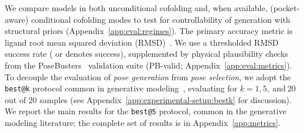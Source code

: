 \documentclass[11pt, letterpaper, onecolumn]{tau-class/tau}
\makeatletter
\newcommand{\best}[1]{\texttt{best@#1}\xspace}
\newcommand{\bestk}{\best{k}}
\newcommand{\ltonea}{\text{\raisebox{0.25ex}{\scriptsize <}\,1\,\AA}\xspace}
\newcommand{\lttwoa}{\text{\raisebox{0.25ex}{\scriptsize <}\,2\,\AA}\xspace}
\newcommand{\posebusters}{PoseBusters\xspace}
\let\oldAA\AA
\renewcommand{\AA}{\oldAA\xspace}
\makeatother
\begin{document}
We compare models in both unconditional cofolding and, when available, (pocket-aware) conditional cofolding modes to test for controllability of generation with structural priors (Appendix~\ref{app:eval:regimes}).
The primary accuracy metric is ligand root mean squared deviation (RMSD)~\cite{gilson2025assessment}.
We use a thresholded RMSD success rate (\lttwoa or \ltonea denotes success), supplemented by physical plausibility checks from the \posebusters~\cite{buttenschoen2024posebusters} validation suite (PB-valid; Appendix~\ref{app:eval:metrics}).
To decouple the evaluation of \textit{pose generation} from \textit{pose selection}, we adopt the \bestk protocol common in generative modeling~\cite{chen2021evaluating}, evaluating for $k=1, 5,~\mathrm{and}~20$ out of 20 samples (see Appendix~\ref{app:experimental-setup:bestk} for discussion).
We report the main results for the \best5 protocol, common in the generative modeling literature; the complete set of results is in Appendix~\ref{app:metrics}.
\end{document}
